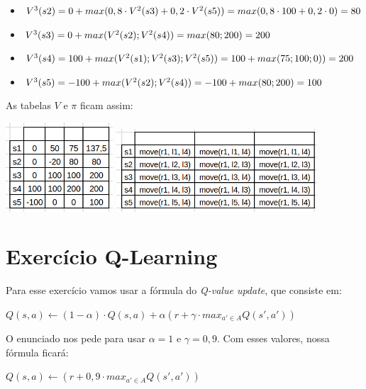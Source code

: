 \documentclass[12pt,letterpaper]{article}
\begin{document}
\begin{itemize}
\begin{itemize}
			\item $V^3(s2) = 0 + max(0,8\cdot V^2(s3) + 0,2\cdot V^2(s5)) \\= max(0,8\cdot 100 + 0,2\cdot 0) = 80$
			\item $V^3(s3) = 0 + max(V^2(s2);V^2(s4)) \\= max(80; 200) = 200$
			\item $V^3(s4) = 100 + max(V^2(s1);V^2(s3);V^2(s5)) \\= 100 + max(75;100;0)) = 200$
			\item $V^3(s5) = -100 + max(V^2(s2);V^2(s4)) \\= -100 + max(80;200) = 100$
		\end{itemize}
	\end{itemize}
	
	As tabelas $V$ e $\pi$ ficam assim:
	
	\includegraphics[width=4cm]{tabelav.png}
	\includegraphics[width=7.5cm]{tabelapi.png}

	\section*{Exercício Q-Learning}
	
	Para esse exercício vamos usar a fórmula do \textit{Q-value update}, que consiste em:
	
	\begin{center}
		$Q(s,a) \leftarrow (1-\alpha)\cdot Q(s,a) + \alpha(r+\gamma\cdot max_{a'\in A}Q(s',a'))$
	\end{center}
	
	O enunciado nos pede para usar $\alpha = 1$ e $\gamma = 0,9$. Com esses valores, nossa fórmula ficará: 
	
	\begin{center}
		$Q(s,a) \leftarrow (r+0,9\cdot max_{a'\in A}Q(s',a'))$
	\end{center}
	
\end{document}
